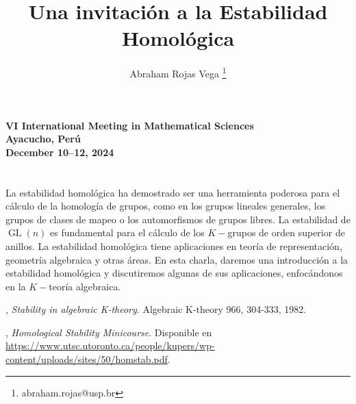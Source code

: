 \documentclass[11pt,a4paper]{article}
\title{Una invitación a la Estabilidad Homológica}
\author[1]{Abraham Rojas Vega \thanks{abraham.rojas@usp.br} }
\affil[1]{Instituto de Ciências Matemáticas e de Computação, Universidade de São Paulo, Brasil}
\date{} %
\renewenvironment{abstract}{%
	\section*{\abstractname}}
	{}
\begin{document}




\begin{flushleft}
\bfseries\footnotesize VI International Meeting in Mathematical Sciences\\
Ayacucho, Perú\\
December 10--12, 2024
\end{flushleft}

{\let\newpage\relax\maketitle}

\begin{abstract}

	La estabilidad homológica ha demostrado ser una herramienta poderosa para el cálculo de la homología de grupos, como en los grupos lineales generales, los grupos de clases de mapeo o los automorfismos de grupos libres. La estabilidad de $\operatorname{GL}(n)$ es fundamental para el cálculo de los $K-$grupos de orden superior de anillos. La estabilidad homológica tiene aplicaciones en teoría de representación, geometría algebraica y otras áreas. En esta charla, daremos una introducción a la estabilidad homológica y discutiremos algunas de sus aplicaciones, enfocándonos en la $K-$teoría algebraica.

\end{abstract}

\begin{thebibliography}{99}

, {\em Stability in algebraic K-theory}. Algebraic K-theory 966, 304-333, 1982.

, {\em Homological Stability Minicourse}. Disponible en \url{https://www.utsc.utoronto.ca/people/kupers/wp-content/uploads/sites/50/homstab.pdf}.



\end{thebibliography}
\end{document}
